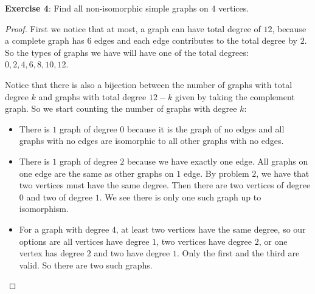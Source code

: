 \documentclass{article}
\begin{document}
\textbf{Exercise 4}: Find all non-isomorphic simple graphs on $4$ vertices.
    \begin{proof}
        First we notice that at most, a graph can have total degree of $12$, because a complete graph has $6$ edges and each edge contributes to the total degree by $2$. So the types of graphs we have will have one of the total degrees: $0, 2, 4, 6, 8, 10, 12$. 

        Notice that there is also a bijection between the number of graphs with total degree $k$ and graphs with total degree $12 - k$ given by taking the complement graph. So we start counting the number of graphs with degree $k$:
            \begin{itemize}
                \item There is $1$ graph of degree $0$ because it is the graph of no edges and all graphs with no edges are isomorphic to all other graphs with no edges.

                \item There is $1$ graph of degree $2$ because we have exactly one edge. All graphs on one edge are the same as other graphs on $1$ edge. By problem $2$, we have that two vertices must have the same degree. Then there are two vertices of degree $0$ and two of degree $1$. We see there is only one such graph up to isomorphism.

                \item For a graph with degree $4$, at least two vertices have the same degree, so our options are all vertices have degree $1$, two vertices have degree $2$, or one vertex has degree $2$ and two have degree $1$. Only the first and the third are valid. So there are two such graphs.


\end{itemize}
\end{proof}
\end{document}
